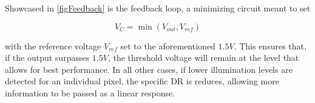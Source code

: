 Showcased in \ref{figFeedback} is the feedback loop, a minimizing circuit meant to set

\begin{equation}
    \label{eqFeedback}
    V_{C} = \min(V_{out}, V_{ref})
\end{equation}

with the reference voltage \(V_{ref}\) set to the aforementioned \(1.5V\). This ensures that, if the output surpasses \(1.5V\),
the threshold voltage will remain at the level that allows for best performance. In all other cases, if lower illumination
levels are detected for an individual pixel, the specific DR is reduces, allowing more information to be 
passed as a linear response.
